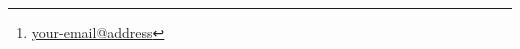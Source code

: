 \documentclass[11pt, a4paper]{article}
\begin{document}
\title{}
\author{Your name \footnote{\href{mailto:your-email@address}{your-email@address}}}
\maketitle
\tableofcontents

\end{document}
